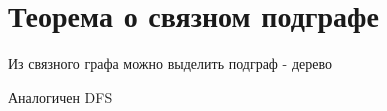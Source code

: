 \documentclass[discrete.tex]{subfiles}
\begin{document}
\section{Теорема о связном подграфе}

\begin{theorem}
    Из связного графа можно выделить подграф - дерево
\end{theorem}

\begin{definition}
    Аналогичен DFS
\end{definition}
\end{document}
